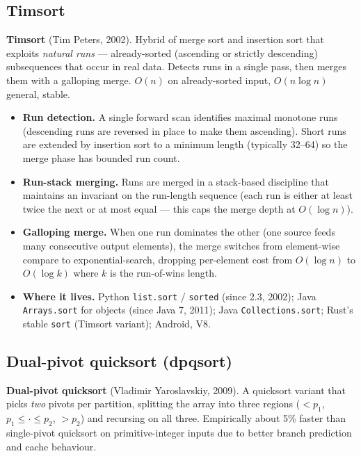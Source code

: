 \documentclass[11pt]{article}
\begin{document}
\subsection*{Timsort}

\begin{defnbox}
\textbf{Timsort} (Tim Peters, 2002). Hybrid of merge sort and
insertion sort that exploits \emph{natural runs} ---
already-sorted (ascending or strictly descending) subsequences
that occur in real data. Detects runs in a single pass, then
merges them with a galloping merge. $O(n)$ on already-sorted
input, $O(n \log n)$ general, stable.
\end{defnbox}

\begin{itemize}[leftmargin=*]
    \item \textbf{Run detection.} A single forward scan
          identifies maximal monotone runs (descending runs are
          reversed in place to make them ascending). Short runs
          are extended by insertion sort to a minimum length
          (typically 32--64) so the merge phase has bounded
          run count.
    \item \textbf{Run-stack merging.} Runs are merged in a
          stack-based discipline that maintains an invariant on
          the run-length sequence (each run is either at least
          twice the next or at most equal --- this caps the
          merge depth at $O(\log n)$).
    \item \textbf{Galloping merge.} When one run dominates the
          other (one source feeds many consecutive output
          elements), the merge switches from element-wise compare
          to exponential-search, dropping per-element cost from
          $O(\log n)$ to $O(\log k)$ where $k$ is the run-of-wins
          length.
    \item \textbf{Where it lives.} Python \texttt{list.sort} /
          \texttt{sorted} (since 2.3, 2002); Java
          \texttt{Arrays.sort} for objects (since Java 7, 2011);
          Java \texttt{Collections.sort}; Rust's stable
          \texttt{sort} (Timsort variant); Android, V8.
\end{itemize}

\subsection*{Dual-pivot quicksort (dpqsort)}

\begin{defnbox}
\textbf{Dual-pivot quicksort} (Vladimir Yaroslavskiy, 2009). A
quicksort variant that picks \emph{two} pivots per partition,
splitting the array into three regions ($< p_1$, $p_1 \le \cdot \le p_2$,
$> p_2$) and recursing on all three. Empirically about 5\%
faster than single-pivot quicksort on primitive-integer inputs
due to better branch prediction and cache behaviour.
\end{defnbox}
\end{document}
